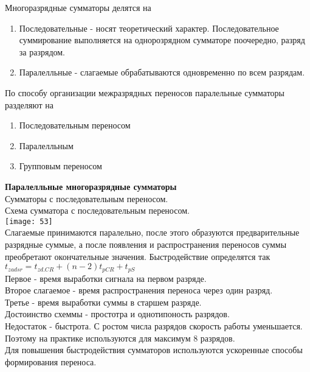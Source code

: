Многоразрядные сумматоры делятся на
\begin{enumerate}
  \item Последовательные - носят теоретический характер.
  Последовательное суммирование выполняется на однорозрядном сумматоре поочередно, разряд за разрядом.
  \item Паралелльные - слагаемые обрабатываются одновременно по всем разрядам.
\end{enumerate}

По способу организации межразрядных переносов паралельные сумматоры разделяют на
\begin{enumerate}
  \item Последовательным переносом
  \item Паралелльным
  \item Групповым переносом
\end{enumerate}

\newpage
\Large{ \textbf {Паралелльные многоразрядные сумматоры}}\\
Сумматоры с последовательным переносом.\\
Схема сумматора с последовательным переносом.\\
\texttt{[image: 53]}\\
Слагаемые принимаются паралельно, после этого образуются предварительные разрядные суммые, а после появления и распространения  переносов суммы преобретают окончательные значения.
Быстродействие определятся так $ t_{zadsr} = t_{zd.CR} + (n-2) t_{pCR} + t_{pS}  $\\
Первое - время выработки сигнала на первом разряде.\\
Второе слагаемое - время распространения переноса через один разряд.\\
Третье - время выработки суммы в старшем разряде.\\
Достоинство схеммы - простотра и однотипоность разрядов.\\
Недостаток - быстрота. С ростом числа разрядов скорость работы уменьшается. Поэтому на практике используются для максимум 8 разрядов.\\
Для повышения быстродействия сумматоров используются ускоренные способы формирования переноса.\\

